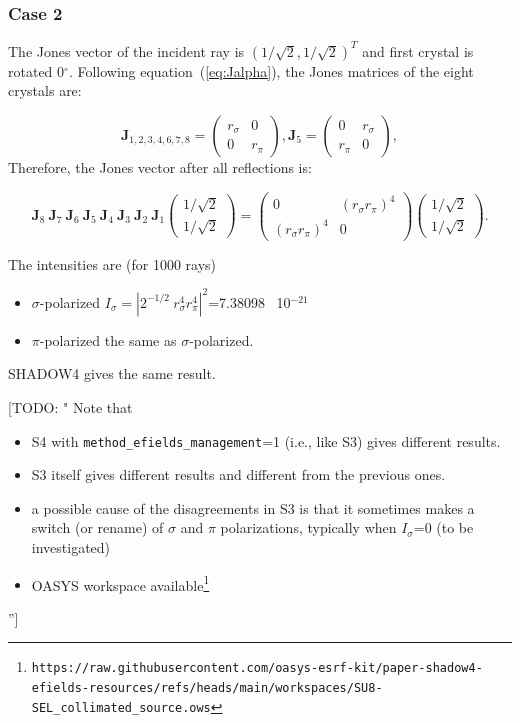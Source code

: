 \documentclass{iucr}
\newcommand{\todo}[1]{{\color{red}[TODO: "#1'']}}
\begin{document}
\subsubsection{Case 2}
The Jones vector of the incident ray is $(1/\sqrt{2},1/\sqrt{2})^T$ and first crystal is rotated 0$^\circ$. Following equation~(\ref{eq:Jalpha}), the Jones matrices of the eight crystals are: 

\begin{equation}\label{eq:Jcase2}
\textbf{J}_{1,2,3,4,6,7,8}=
    \begin{pmatrix}
r_\sigma & 0\\
0& 
r_\pi
\end{pmatrix},
\textbf{J}_{5}=
    \begin{pmatrix}
0 & r_\sigma\\ 
r_\pi & 0\end{pmatrix},
\end{equation}
Therefore, the Jones vector after all reflections is:

\begin{equation}\label{eq:JVcase2}
\textbf{J}_8~\textbf{J}_7~\textbf{J}_6~\textbf{J}_5~\textbf{J}_4~\textbf{J}_3~\textbf{J}_2~\textbf{J}_1
    \begin{pmatrix}
    1/\sqrt{2}\\1/\sqrt{2}
    \end{pmatrix}=
\begin{pmatrix}
  0 & (r_\sigma r_\pi)^4 \\
  (r_\sigma r_\pi)^4 & 0
\end{pmatrix}    \begin{pmatrix}
    1/\sqrt{2}\\1/\sqrt{2}
    \end{pmatrix}.
\end{equation}

The intensities are (for 1000 rays)
\begin{itemize}
    \item $\sigma$-polarized $I_\sigma=|2^{-1/2}~r_\sigma^4 r_\pi^4|^2$=7.38098~ 10$^{-21}$
    \item $\pi$-polarized the same as $\sigma$-polarized.
\end{itemize}

SHADOW4 gives the same result.

\todo{
Note that 
\begin{itemize}
    \item S4 with {\tt method\_efields\_management}=1 (i.e., like S3) gives different results. 
    \item S3 itself gives different results and different from the previous ones.
    \item a possible cause of the disagreements in S3 is that it sometimes makes a switch (or rename) of $\sigma$ and $\pi$ polarizations, typically when $I_\sigma$=0 (to be investigated)
    \item OASYS workspace available\footnote{ \tiny {\tt https://raw.githubusercontent.com/oasys-esrf-kit/paper-shadow4-efields-resources/refs/heads/main/workspaces/SU8-SEL\_collimated\_source.ows}} 
\end{itemize}
}
\end{document}
